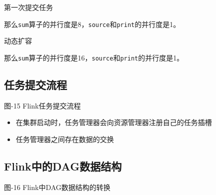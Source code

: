 第一次提交任务

\begin{Shaded}
\begin{Highlighting}[]
\ExtensionTok{$}
\end{Highlighting}
\end{Shaded}

那么\texttt{sum}算子的并行度是8，\texttt{source}和\texttt{print}的并行度是1。

动态扩容

\begin{Shaded}
\begin{Highlighting}[]
\ExtensionTok{$}
\end{Highlighting}
\end{Shaded}

那么\texttt{sum}算子的并行度是16，\texttt{source}和\texttt{print}的并行度是1。

\hypertarget{ux4efbux52a1ux63d0ux4ea4ux6d41ux7a0b}{%
\subsection{任务提交流程}\label{ux4efbux52a1ux63d0ux4ea4ux6d41ux7a0b}}

图-15 Flink任务提交流程

\begin{itemize}
\tightlist
\item
  在集群启动时，任务管理器会向资源管理器注册自己的任务插槽
\item
  任务管理器之间存在数据的交换
\end{itemize}

\hypertarget{flinkux4e2dux7684dagux6570ux636eux7ed3ux6784}{%
\subsection{Flink中的DAG数据结构}\label{flinkux4e2dux7684dagux6570ux636eux7ed3ux6784}}

图-16 Flink中DAG数据结构的转换

